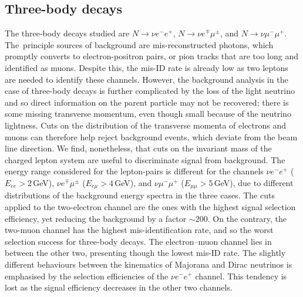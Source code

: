\subsection{Three-body decays}

The three-body decays studied are $N\to \nu e^- e^+$, $N\to \nu e^\mp \mu^\pm$, and $N\to \nu \mu^- \mu^+$.
The~principle sources of background are mis-reconstructed photons, which promptly converts to electron-positron pairs, %
or pion tracks that are too long and identified as muons.
Despite this, the mis-ID rate is already low as two leptons are needed to identify these channels.
However, the background analysis in the case of three-body decays is further complicated by the loss of the light neutrino %
and so direct information on the parent particle may not be recovered; %
there is some missing transverse momentum, even though small because of the neutrino lightness.
Cuts on the distribution of the transverse momenta of electrons and muons can therefore help reject background events, %
which deviate from the beam line direction.
We find, nonetheless, that cuts on the invariant mass of the charged lepton system %
\enlargethispage{\baselineskip}
are useful to discriminate signal from background.
The energy range considered for the lepton-pairs is different for the channels $\nu e^- e^+$ ($E_{ee} > 2$\,GeV), %
$\nu e^\mp \mu^\pm$ ($E_{e\mu} > 4$\,GeV), and $\nu \mu^-\mu^+$ ($E_{\mu\mu} > 5$\,GeV), %
due to  different distributions of the background energy spectra in the three cases.
The cuts applied to the two-electron channel are the ones with the highest signal selection efficiency, %
yet reducing the background by a factor $\sim200$.
On the contrary, the two-muon channel has the highest mis-identification rate, %
and so the worst selection success for three-body decays.
The electron--muon channel lies in between the other two, presenting though the lowest mis-ID rate. 
The slightly different behaviours between the kinematics of Majorana and Dirac neutrinos is emphasised %
by the selection efficiencies of the $\nu e^- e^+$ channel.
This tendency is lost as the signal efficiency decreases in the other two channels.

